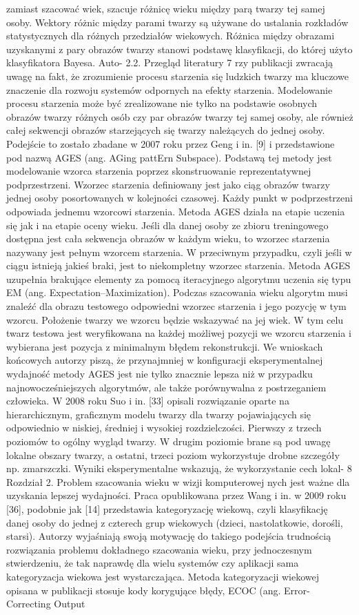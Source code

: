 zamiast szacować wiek, szacuje różnicę wieku między parą twarzy tej samej osoby. Wektory różnic między parami twarzy są używane do ustalania rozkładów statystycznych dla różnych przedziałów wiekowych. Różnica między obrazami uzyskanymi z pary obrazów twarzy stanowi podstawę klasyfikacji, do której użyto klasyfikatora Bayesa. Auto- 2.2. Przegląd literatury 7 rzy publikacji zwracają uwagę na fakt, że zrozumienie procesu starzenia się ludzkich twarzy ma kluczowe znaczenie dla rozwoju systemów odpornych na efekty starzenia. Modelowanie procesu starzenia może być zrealizowane nie tylko na podstawie osobnych obrazów twarzy różnych osób czy par obrazów twarzy tej samej osoby, ale również całej sekwencji obrazów starzejących się twarzy należących do jednej osoby. Podejście to zostało zbadane w 2007 roku przez Geng i in. [9] i przedstawione pod nazwą AGES (ang. AGing pattErn Subspace). Podstawą tej metody jest modelowanie wzorca starzenia poprzez skonstruowanie reprezentatywnej podprzestrzeni. Wzorzec starzenia definiowany jest jako ciąg obrazów twarzy jednej osoby posortowanych w kolejności czasowej. Każdy punkt w podprzestrzeni odpowiada jednemu wzorcowi starzenia. Metoda AGES działa na etapie uczenia się jak i na etapie oceny wieku. Jeśli dla danej osoby ze zbioru treningowego dostępna jest cała sekwencja obrazów w każdym wieku, to wzorzec starzenia nazywany jest pełnym wzorcem starzenia. W przeciwnym przypadku, czyli jeśli w ciągu istnieją jakieś braki, jest to niekompletny wzorzec starzenia. Metoda AGES uzupełnia brakujące elementy za pomocą iteracyjnego algorytmu uczenia się typu EM (ang. Expectation–Maximization). Podczas szacowania wieku algorytm musi znaleźć dla obrazu testowego odpowiedni wzorzec starzenia i jego pozycję w tym wzorcu. Położenie twarzy we wzorcu będzie wskazywać na jej wiek. W tym celu twarz testowa jest weryfikowana na każdej możliwej pozycji we wzorcu starzenia i wybierana jest pozycja z minimalnym błędem rekonstrukcji. We wnioskach końcowych autorzy piszą, że przynajmniej w konfiguracji eksperymentalnej wydajność metody AGES jest nie tylko znacznie lepsza niż w przypadku najnowocześniejszych algorytmów, ale także porównywalna z postrzeganiem człowieka. W 2008 roku Suo i in. [33] opisali rozwiązanie oparte na hierarchicznym, graficznym modelu twarzy dla twarzy pojawiających się odpowiednio w niskiej, średniej i wysokiej rozdzielczości. Pierwszy z trzech poziomów to ogólny wygląd twarzy. W drugim poziomie brane są pod uwagę lokalne obszary twarzy, a ostatni, trzeci poziom wykorzystuje drobne szczegóły np. zmarszczki. Wyniki eksperymentalne wskazują, że wykorzystanie cech lokal- 8 Rozdział 2. Problem szacowania wieku w wizji komputerowej nych jest ważne dla uzyskania lepszej wydajności. Praca opublikowana przez Wang i in. w 2009 roku [36], podobnie jak [14] przedstawia kategoryzację wiekową, czyli klasyfikację danej osoby do jednej z czterech grup wiekowych (dzieci, nastolatkowie, dorośli, starsi). Autorzy wyjaśniają swoją motywację do takiego podejścia trudnością rozwiązania problemu dokładnego szacowania wieku, przy jednoczesnym stwierdzeniu, że tak naprawdę dla wielu systemów czy aplikacji sama kategoryzacja wiekowa jest wystarczająca. Metoda kategoryzacji wiekowej opisana w publikacji stosuje kody korygujące błędy, ECOC (ang. Error-Correcting Output 
